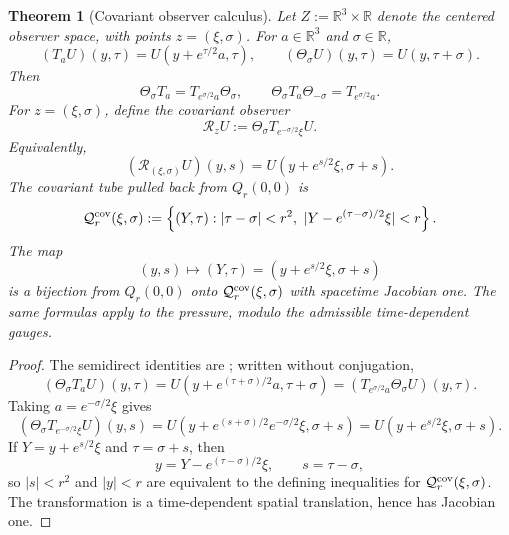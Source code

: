 \documentclass[11pt]{amsart}
\numberwithin{equation}{section}
\theoremstyle{plain}
\newtheorem{theorem}{Theorem}[section]
\theoremstyle{definition}
\theoremstyle{remark}
\newcommand{\calR}{\mathcal R}
\begin{document}
\begin{theorem}[Covariant observer calculus]
\label{thm:covariant-observer-calculus}
Let \(Z:=\mathbb R^3\times\mathbb R\) denote the centered observer space, with
points \(z=(\xi,\sigma)\).  For \(a\in\mathbb R^3\) and
\(\sigma\in\mathbb R\),
\[
   (T_aU)(y,\tau)=U(y+e^{\tau/2}a,\tau),
   \qquad
   (\Theta_\sigma U)(y,\tau)=U(y,\tau+\sigma).
\]
Then
\[
   \Theta_\sigma T_a=T_{e^{\sigma/2}a}\Theta_\sigma,
   \qquad
   \Theta_\sigma T_a\Theta_{-\sigma}=T_{e^{\sigma/2}a}.
\]
For \(z=(\xi,\sigma)\), define the covariant observer
\[
   \calR_zU
   :=
   \Theta_\sigma T_{e^{-\sigma/2}\xi}U .
\]
Equivalently,
\[
   (\calR_{(\xi,\sigma)}U)(y,s)
   =
   U(y+e^{s/2}\xi,\sigma+s).
\]
The covariant tube pulled back from \(Q_r(0,0)\) is
\[
   \mathcal Q_r^{\rm cov}(\xi,\sigma)
   :=
   \left\{
      (Y,\tau):
      |\tau-\sigma|<r^2,\ 
      |Y-e^{(\tau-\sigma)/2}\xi|<r
   \right\}.
\]
The map
\[
   (y,s)\mapsto(Y,\tau)
   =
   (y+e^{s/2}\xi,\sigma+s)
\]
is a bijection from \(Q_r(0,0)\) onto
\(\mathcal Q_r^{\rm cov}(\xi,\sigma)\) with spacetime Jacobian one.  The same
formulas apply to the pressure, modulo the admissible time-dependent gauges.
\end{theorem}

\begin{proof}
The semidirect identities are
; written without conjugation,
\[
   (\Theta_\sigma T_aU)(y,\tau)
   =
   U(y+e^{(\tau+\sigma)/2}a,\tau+\sigma)
   =
   (T_{e^{\sigma/2}a}\Theta_\sigma U)(y,\tau).
\]
Taking \(a=e^{-\sigma/2}\xi\) gives
\[
   (\Theta_\sigma T_{e^{-\sigma/2}\xi}U)(y,s)
   =
   U(y+e^{(s+\sigma)/2}e^{-\sigma/2}\xi,\sigma+s)
   =
   U(y+e^{s/2}\xi,\sigma+s).
\]
If \(Y=y+e^{s/2}\xi\) and \(\tau=\sigma+s\), then
\[
   y=Y-e^{(\tau-\sigma)/2}\xi,\qquad s=\tau-\sigma,
\]
so \(|s|<r^2\) and \(|y|<r\) are equivalent to the defining inequalities for
\(\mathcal Q_r^{\rm cov}(\xi,\sigma)\).  The transformation is a
time-dependent spatial translation, hence has Jacobian one.
\end{proof}
\end{document}
